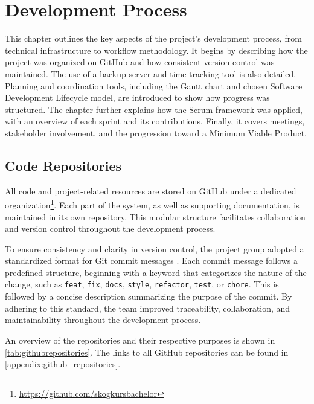 \chapter{Development Process}\label{chap:developmentprocess}

This chapter outlines the key aspects of the project's development process, from technical infrastructure to workflow methodology. It begins by describing how the project was organized on GitHub and how consistent version control was maintained. The use of a backup server and time tracking tool is also detailed. Planning and coordination tools, including the Gantt chart and chosen Software Development Lifecycle model, are introduced to show how progress was structured. The chapter further explains how the Scrum framework was applied, with an overview of each sprint and its contributions. Finally, it covers meetings, stakeholder involvement, and the progression toward a Minimum Viable Product.

\section{Code Repositories}

All code and project-related resources are stored on GitHub under a dedicated organization\footnote{\url{https://github.com/skogkursbachelor}}. Each part of the system, as well as supporting documentation, is maintained in its own repository. This modular structure facilitates collaboration and version control throughout the development process. 

To ensure consistency and clarity in version control, the project group adopted a standardized format for Git commit messages \cite{commit_standard}. Each commit message follows a predefined structure, beginning with a keyword that categorizes the nature of the change, such as \texttt{feat}, \texttt{fix}, \texttt{docs}, \texttt{style}, \texttt{refactor}, \texttt{test}, or \texttt{chore}. This is followed by a concise description summarizing the purpose of the commit. By adhering to this standard, the team improved traceability, collaboration, and maintainability throughout the development process.

An overview of the repositories and their respective purposes is shown in \autoref{tab:githubrepositories}. The links to all GitHub repositories can be found in \autoref{appendix:github_repositories}.

